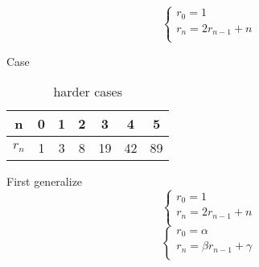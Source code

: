 \begin{equation*}
    \left\{
        \begin{array}{l}
            r_0 = 1\\
            r_n = 2r_{n-1}+n\\
        \end{array}
    \right.
\end{equation*}

Case 
\begin{table}[htbp]
	\centering
	\small
	\caption{harder cases}
	\begin{tabular}{c|cccccc}
		\toprule
		n & 0 & 1 & 2 & 3 & 4 & 5 \\
		\midrule
        $ r_n $  & 1 & 3 & 8 & 19 & 42 & 89 \\
		\bottomrule
	\end{tabular}%
	\label{tab:casesofharder}%
\end{table}%

First generalize
\begin{equation*}
    \left\{
        \begin{array}{l}
            r_0 = 1\\
            r_n = 2r_{n-1}+n\\
        \end{array}
    \right.
\end{equation*}
\begin{equation*}
    \left\{
        \begin{array}{l}
            r_0 = \alpha\\
            r_n = \beta r_{n-1}+\gamma \\
        \end{array}
    \right.
\end{equation*}

